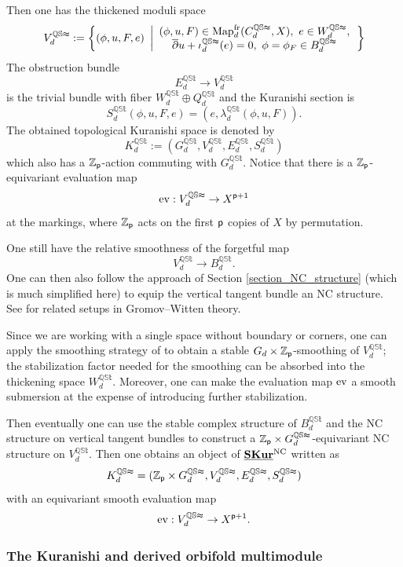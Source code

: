 \documentclass[reqno, 10pt]{amsart}
\numberwithin{equation}{section}
\numberwithin{equation}{section}
\theoremstyle{definition}
\theoremstyle{remark}
\newcommand{\beqn}{\begin{equation*}}
\newcommand{\eeqn}{\end{equation*}}
\newcommand{\ov}{\overline}
\newcommand{\mb}{\mathbb}
\newcommand{\p}{{\sf p}}
\newcommand{\zp}{{{\mb Z}_{\sf p}}}
\newcommand{\uds}[1]{\underline{\smash{#1}}}
\newcommand{\ev}{{\rm ev}}
\begin{document}
Then one has the thickened moduli space
\beqn
V_d^{\mb{QSt}}:= \left\{ (\phi, u, F, e)\ \left| \begin{array}{c} (\phi, u, F) \in {\rm Map}_d^{\rm fr}(C_d^{\mb{QSt}}, X),\ e \in W_d^{\mb{QSt}},\\
\ov\partial u + \iota_d^{\mb{QSt}} (e) = 0,\ \phi = \phi_F \in B_d^{\mb{QSt}}  \end{array} \right.\right\}
\eeqn
The obstruction bundle 
\beqn
E_d^{\mb{QSt}} \to V_d^{\mb{QSt}}
\eeqn
is the trivial bundle with fiber $W_d^{\mb{QSt}} \oplus Q_d^{\mb{QSt}}$ and the Kuranishi section is 
\beqn
S_d^{\mb{QSt}} (\phi, u, F, e) = (e, \lambda_d^{\mb{QSt}} (\phi, u, F)).
\eeqn
The obtained topological Kuranishi space is denoted by 
\beqn
K_d^{\mb{QSt}}:= (G_d^{\mb{QSt}}, V_d^{\mb{QSt}}, E_d^{\mb{QSt}}, S_d^{\mb{QSt}})
\eeqn
which also has a $\zp$-action commuting with $G_d^{\mb{QSt}}$.
Notice that there is a $\zp$-equivariant evaluation map
\beqn
\ev: V_d^{\mb{QSt}} \to X^{\p + 1}
\eeqn
at the markings, where $\zp$ acts on the first $\p$ copies of $X$ by permutation.

One still have the relative smoothness of the forgetful map 
\beqn
V_d^{\mb{QSt}} \to B_d^{\mb{QSt}}.
\eeqn
One can then also follow the approach of Section \ref{section_NC_structure} (which is much simplified here) to equip the vertical tangent bundle an NC structure. See \cite[Section 6.2]{Bai_Xu_2022} for related setups in Gromov--Witten theory.

Since we are working with a single space without boundary or corners, one can apply the smoothing strategy of \cite{AMS} to obtain a stable $G_d \times \zp$-smoothing of $V_d^{\mb{QSt}}$; the stabilization factor needed for the smoothing can be absorbed into the thickening space $W_d^{\mb{QSt}}$. Moreover, one can make the evaluation map $\ev$ a smooth submersion at the expense of introducing further stabilization. 

Then eventually one can use the stable complex structure of $B_d^{\mb{QSt}}$ and the NC structure on vertical tangent bundles to construct a $\zp\times G_d^{\mb{QSt}}$-equivariant NC structure on $V_d^{\mb{QSt}}$. Then one obtains an object of $\uds{\bf SKur}^{\rm NC}$ written as
\beqn
K_d^{\mb{QSt}} = (\zp\times G_d^{\mb{QSt}}, V_d^{\mb{QSt}}, E_d^{\mb{QSt}}, S_d^{\mb{QSt}})
\eeqn
with an equivariant smooth evaluation map
\beqn
\ev: V_d^{\mb{QSt}} \to X^{\p + 1}.
\eeqn



\subsubsection{The Kuranishi and derived orbifold multimodule}
\end{document}
